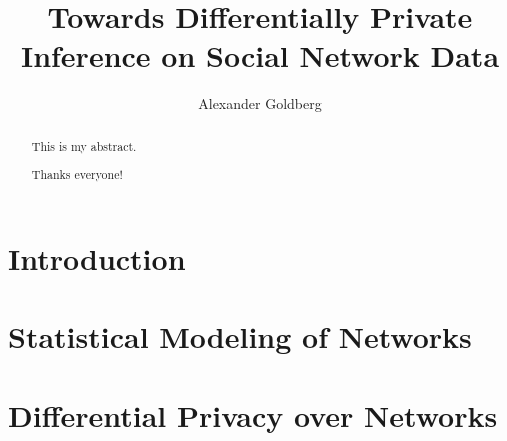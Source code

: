 \documentclass[12pt]{report}
\title{
	{Towards Differentially Private Inference on Social Network Data}\\
}
\author{Alexander Goldberg}
\date{}
\begin{document}
	
	\maketitle 
	
	\begin{abstract}
		This is my abstract.
	\end{abstract}

	\renewcommand\abstractname{Acknowledgements}
	\begin{abstract}
		Thanks everyone!
	\end{abstract}
	
	\tableofcontents
	
	\chapter{Introduction}\label{ch:intro}
	
	
	
	\chapter[Statistical Modeling of Networks]{Statistical Modeling of Networks}
	\label{ch:network_modeling}
	
	
	
	\chapter{Differential Privacy over Networks}\label{ch:dp_defns}
	
	
	
	
\end{document}
